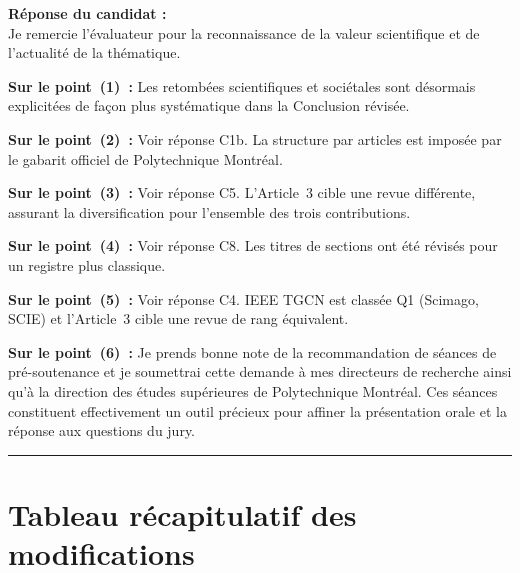 \documentclass[12pt,a4paper]{article}
\newcommand{\Reponse}[1]{%
  \begin{responsebox}
    \textbf{Réponse du candidat :}\\#1
  \end{responsebox}%
}
\begin{document}
\Reponse{
Je remercie l'évaluateur pour la reconnaissance de la valeur scientifique et de l'actualité de la thématique.

\textbf{Sur le point~(1)~:} Les retombées scientifiques et sociétales sont désormais explicitées de façon plus systématique dans la Conclusion révisée.

\textbf{Sur le point~(2)~:} Voir réponse C1b. La structure par articles est imposée par le gabarit officiel de Polytechnique Montréal.

\textbf{Sur le point~(3)~:} Voir réponse C5. L'Article~3 cible une revue différente, assurant la diversification pour l'ensemble des trois contributions.

\textbf{Sur le point~(4)~:} Voir réponse C8. Les titres de sections ont été révisés pour un registre plus classique.

\textbf{Sur le point~(5)~:} Voir réponse C4. IEEE TGCN est classée Q1 (Scimago, SCIE) et l'Article~3 cible une revue de rang équivalent.

\textbf{Sur le point~(6)~:} Je prends bonne note de la recommandation de séances de pré-soutenance et je soumettrai cette demande à mes directeurs de recherche ainsi qu'à la direction des études supérieures de Polytechnique Montréal. Ces séances constituent effectivement un outil précieux pour affiner la présentation orale et la réponse aux questions du jury.
}

\bigskip
\hrule
\bigskip

\section*{Tableau récapitulatif des modifications}
\end{document}
